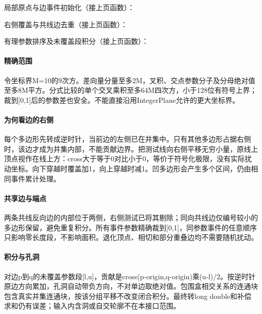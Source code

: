 \Needspace{532pt}



\newpage

局部原点与边事件初始化（接上页函数）：



\newpage

右侧覆盖与共线边去重（接上页函数）：



\newpage

有理参数排序及未覆盖段积分（接上页函数）：



\paragraph{精确范围} 令坐标界M=10的9次方。差向量分量至多2M，叉积、交点参数分子及分母绝对值至多8M平方。分式比较的单个交叉乘积至多64M四次方，小于128位有符号上界；裁到[0,1]后的参数差也安全。不能直接沿用IntegerPlane允许的更大坐标界。

\newpage

\paragraph{为何看边的右侧} 每个多边形先转成逆时针，当前边的左侧已在并集中。只有其他多边形占据右侧时，该边才成为并集内部，不能贡献边界。把测试线向右侧平移无穷小量，原线上顶点视作在线上方：cross大于等于0对比小于0，等价于符号化极限，没有实际扰动坐标。向下穿越时覆盖加1，向上穿越时减1。凹多边形会产生多个区间，仍由相同事件累计处理。

\paragraph{共享边与端点} 两条共线反向边的内部位于两侧，右侧测试已将其剔除；同向共线边仅编号较小的多边形保留，避免重复积分。所有事件参数精确裁到[0,1]，同参数事件的任意顺序只影响零长度段，不影响面积。退化顶点、相切和部分重叠边均不需要随机扰动。

\paragraph{积分与孔洞} 对边p到q的未覆盖参数段[l,u]，贡献是cross(p-origin,q-origin)乘(u-l)/2。按逆时针原边方向累加，孔洞自动带负方向，不对单边取绝对值。包围盒相交关系的连通块包含真实并集连通块，按该分组平移不改变闭合积分。最终转long double和补偿求和仍有误差；输入内含洞或自交轮廓不在本接口范围。

